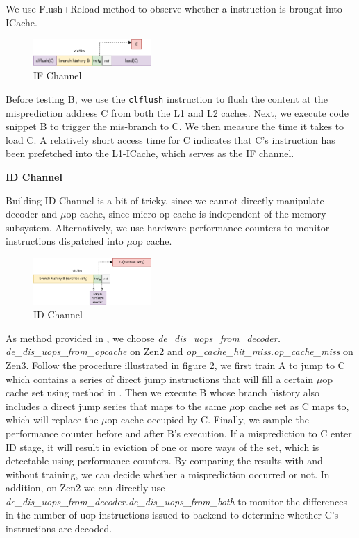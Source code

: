 We use Flush+Reload method \cite{flush_reload} to observe whether a instruction is brought into ICache. 

\begin{figure}[H]
    \centering
    \includegraphics[width=0.4\textwidth]{Figure/IF Channel.png}
    \caption{IF Channel}
    \label{fig:IF Channel}
\end{figure}

Before testing B, we use the \texttt{clflush} instruction to flush the content at the misprediction address C from both the L1 and L2 caches. Next, we execute code snippet B to trigger the mis-branch to C. We then measure the time it takes to load C. A relatively short access time for C indicates that C's instruction has been prefetched into the L1-ICache, which serves as the IF channel.

\textbf{ID Channel}

Building ID Channel is a bit of tricky, since we cannot directly manipulate decoder and $\mu$op cache, since micro-op cache is independent of the memory subsystem. Alternatively, we use hardware performance counters to monitor instructions dispatched into $\mu$op cache.

\begin{figure}[H]
    \centering
    \includegraphics[width=0.4\textwidth]{Figure/ID Channel.png}
    \caption{ID Channel}
    \label{fig:ID Channel}
\end{figure}

As method provided in \cite{phantom}, we choose \textit{de\_dis\_uops\_from\_decoder.} \textit{de\_dis\_uops\_from\_opcache} on Zen2 and \textit{op\_cache\_hit\_miss.op\_cache\_miss} on Zen3. Follow the procedure illustrated in figure \ref{fig:ID Channel}, we first train A to jump to C which contains a series of direct jump instructions that will fill a certain $\mu$op cache set using method in \cite{dead_uop}. Then we execute B whose branch history also includes a direct jump series that maps to the same $\mu$op cache set as C maps to, which will replace the $\mu$op cache occupied by C. Finally, we sample the performance counter before and after B's execution. If a misprediction to C enter ID stage, it will result in eviction of one or more ways of the set, which is detectable using performance counters. By comparing the results with and without training, we can decide whether a misprediction occurred or not. In addition, on Zen2 we can directly use \textit{de\_dis\_uops\_from\_decoder.de\_dis\_uops\_from\_both} to monitor the differences in the number of uop instructions issued to backend to determine whether C's instructions are decoded.

